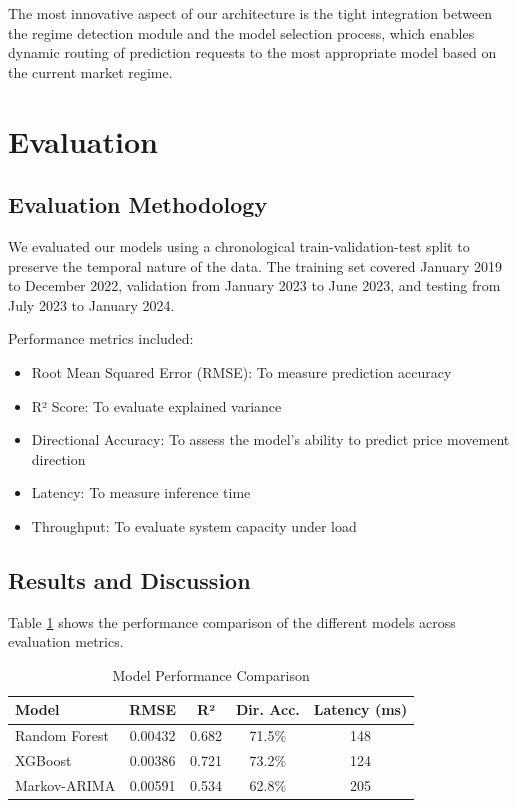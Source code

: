 \documentclass[conference]{IEEEtran}
\begin{document}
The most innovative aspect of our architecture is the tight integration between the regime detection module and the model selection process, which enables dynamic routing of prediction requests to the most appropriate model based on the current market regime.

\section{Evaluation}
\subsection{Evaluation Methodology}
We evaluated our models using a chronological train-validation-test split to preserve the temporal nature of the data. The training set covered January 2019 to December 2022, validation from January 2023 to June 2023, and testing from July 2023 to January 2024.

Performance metrics included:
\begin{itemize}
    \item Root Mean Squared Error (RMSE): To measure prediction accuracy
    \item R² Score: To evaluate explained variance
    \item Directional Accuracy: To assess the model's ability to predict price movement direction
    \item Latency: To measure inference time
    \item Throughput: To evaluate system capacity under load
\end{itemize}

\subsection{Results and Discussion}
Table \ref{tab:model_performance} shows the performance comparison of the different models across evaluation metrics.

\begin{table}[htbp]
\caption{Model Performance Comparison}
\begin{center}
\begin{tabular}{|l|c|c|c|c|}
\hline
\textbf{Model} & \textbf{RMSE} & \textbf{R²} & \textbf{Dir. Acc.} & \textbf{Latency (ms)} \\
\hline
Random Forest & 0.00432 & 0.682 & 71.5\% & 148 \\
\hline
XGBoost & 0.00386 & 0.721 & 73.2\% & 124 \\
\hline
Markov-ARIMA & 0.00591 & 0.534 & 62.8\% & 205 \\
\hline
\end{tabular}
\label{tab:model_performance}
\end{center}
\end{table}
\end{document}
